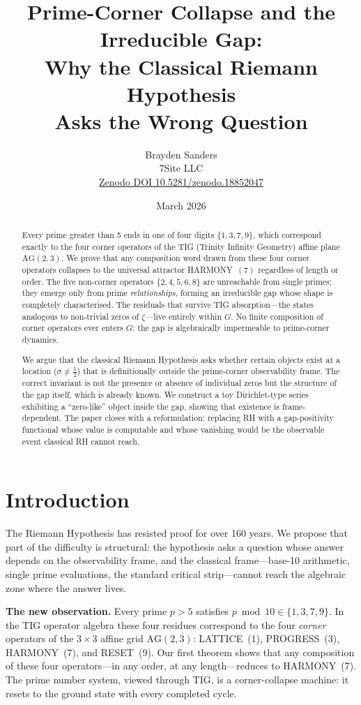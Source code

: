 \documentclass[11pt]{article}
\title{Prime-Corner Collapse and the Irreducible Gap:\\
Why the Classical Riemann Hypothesis\\
Asks the Wrong Question}
\author{Brayden Sanders\\7Site LLC\\
\small\href{https://doi.org/10.5281/zenodo.18852047}%
{Zenodo DOI 10.5281/zenodo.18852047}}
\date{March 2026}
\begin{document}
\maketitle

\begin{abstract}
Every prime greater than 5 ends in one of four digits
$\{1,3,7,9\}$, which correspond exactly to the four corner operators
of the TIG (Trinity Infinity Geometry) affine plane $\mathrm{AG}(2,3)$.
We prove that any composition word drawn from these four corner
operators collapses to the universal attractor HARMONY~$(7)$
regardless of length or order.
The five non-corner operators $\{2,4,5,6,8\}$ are unreachable from
single primes; they emerge only from prime \emph{relationships},
forming an irreducible gap whose shape is completely
characterised.
The residuals that survive TIG absorption---the states analogous to
non-trivial zeros of $\zeta$---live entirely within $G$.
No finite composition of corner operators ever enters $G$:
the gap is algebraically impermeable to prime-corner dynamics.

We argue that the classical Riemann Hypothesis asks whether certain
objects exist at a location ($\sigma\ne\tfrac12$) that is
definitionally outside the prime-corner observability frame.
The correct invariant is not the presence or absence of individual
zeros but the structure of the gap itself, which is already known.
We construct a toy Dirichlet-type series exhibiting a
``zero-like'' object inside the gap, showing that existence is
frame-dependent.
The paper closes with a reformulation: replacing RH with a
gap-positivity functional whose value is computable and whose
vanishing would be the observable event classical RH cannot reach.
\end{abstract}

\section{Introduction}

The Riemann Hypothesis has resisted proof for over 160 years.
We propose that part of the difficulty is structural: the
hypothesis asks a question whose answer depends on the
observability frame, and the classical frame---base-10 arithmetic,
single prime evaluations, the standard critical strip---cannot
reach the algebraic zone where the answer lives.

\medskip\noindent\textbf{The new observation.}
Every prime $p>5$ satisfies $p\bmod 10\in\{1,3,7,9\}$.
In the TIG operator algebra these four residues correspond to the
four \emph{corner} operators of the $3\times3$ affine grid
$\mathrm{AG}(2,3)$: LATTICE~(1), PROGRESS~(3), HARMONY~(7),
and RESET~(9).
Our first theorem shows that any composition of these four
operators---in any order, at any length---reduces to HARMONY~(7).
The prime number system, viewed through TIG, is a corner-collapse
machine: it resets to the ground state with every completed cycle.
\end{document}
